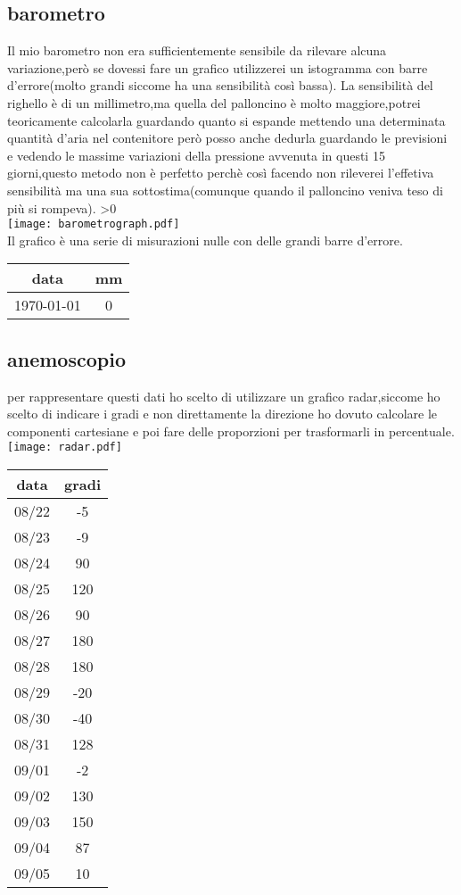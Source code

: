 \documentclass[12pt]{article}
\begin{document}
\subsection{barometro}
Il mio barometro non era sufficientemente sensibile da rilevare alcuna variazione,però se dovessi fare un grafico utilizzerei un istogramma con barre d'errore(molto grandi siccome ha una sensibilità così bassa).
La sensibilità del righello è di un millimetro,ma quella del palloncino è molto maggiore,potrei teoricamente calcolarla guardando quanto si espande mettendo una determinata quantità d'aria nel contenitore però posso anche dedurla guardando le previsioni e vedendo le massime variazioni della pressione avvenuta in questi 15 giorni,questo metodo non è perfetto perchè così facendo non rileverei l'effetiva sensibilità ma una sua sottostima(comunque quando il palloncino veniva teso di più si rompeva).
\newcount\fooo
\long\def\addto#1#2{\expandafter\def\expandafter#1\expandafter{#1#2}}
    \SetDate[22/08/2022]
    \def\tabledata{} 
    \loop
   \addto\tabledata{\AdvanceDate[\value{mycntr}]\today\stepcounter{mycntr} & 0\\
    \hline}
    \advance {}
    \ifnum \fooo>0
    \repeat \\
    \texttt{[image: barometrograph.pdf]} \\
Il grafico è una serie di misurazioni nulle con delle grandi barre d'errore.
    \begin{longtable}{|c|c|}
       \hline
       data & mm \\
       \hline
        \tabledata
    \end{longtable}
\subsection{anemoscopio}
per rappresentare questi dati ho scelto di utilizzare un grafico radar,siccome ho scelto di indicare i gradi e non direttamente la direzione ho dovuto calcolare le componenti cartesiane e poi fare delle proporzioni per trasformarli in percentuale.
\texttt{[image: radar.pdf]} 
\begin{tabular}{|c|c|}
    \hline
    data & gradi \\
    \hline
     08/22 &  -5\\
     08/23 &  -9\\
     08/24 &  90\\
     08/25 &  120\\
     08/26 &  90\\
     08/27 &  180\\
     08/28 &  180\\
     08/29 &  -20\\
     08/30 &  -40\\
     08/31 &  128\\
     09/01 &  -2\\
     09/02 &  130\\
     09/03 &  150\\
     09/04 &  87\\
     09/05 &  10\\
     \hline
\end{tabular} \\
\end{document}
